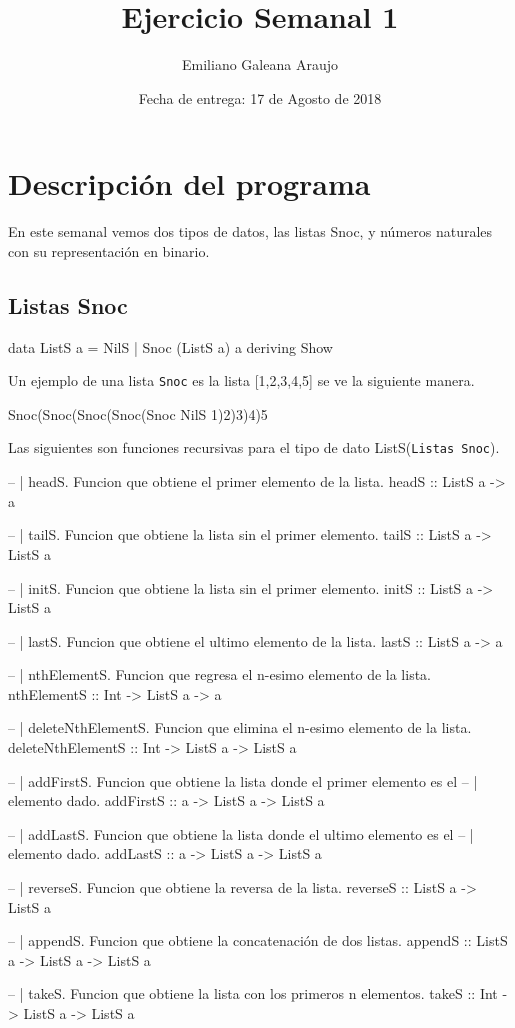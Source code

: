 \documentclass[spanish,12pt,letterpaper]{article}
\title{Ejercicio Semanal 1}
\author{Emiliano Galeana Araujo}
\affil{Facultad de Ciencias, UNAM}
\date{Fecha de entrega: 17 de Agosto de 2018}
\begin{document}
\maketitle

\section{Descripción del programa}
En este semanal vemos dos tipos de datos, las listas Snoc, y números naturales
con su representación en binario.
\subsection{Listas Snoc}

\begin{code}
  data ListS a = NilS | Snoc (ListS a) a deriving Show
\end{code}
Un ejemplo de una lista \texttt{Snoc} es la lista [1,2,3,4,5] se ve la siguiente manera.
\begin{code}
  Snoc(Snoc(Snoc(Snoc(Snoc NilS 1)2)3)4)5
\end{code}

Las siguientes son funciones recursivas para el tipo de dato ListS(\texttt{Listas Snoc}).

\begin{code}
  -- | headS. Funcion que obtiene el primer elemento de la lista.
  headS :: ListS a -> a

  -- | tailS. Funcion que obtiene la lista sin el primer elemento.
  tailS :: ListS a -> ListS a

  -- | initS. Funcion que obtiene la lista sin el primer elemento.
  initS :: ListS a -> ListS a

  -- | lastS. Funcion que obtiene el ultimo elemento de la lista.
  lastS :: ListS a -> a

  -- | nthElementS. Funcion que regresa el n-esimo elemento de la lista.
  nthElementS :: Int -> ListS a -> a

  -- | deleteNthElementS. Funcion que elimina el n-esimo elemento de la lista.
  deleteNthElementS :: Int -> ListS a -> ListS a

  -- | addFirstS. Funcion que obtiene la lista donde el primer elemento es el
  -- | elemento dado.
  addFirstS :: a -> ListS a -> ListS a

  -- | addLastS. Funcion que obtiene la lista donde el ultimo elemento es el
  -- | elemento dado.
  addLastS :: a -> ListS a -> ListS a

  -- | reverseS. Funcion que obtiene la reversa de la lista.
  reverseS :: ListS a -> ListS a

  -- | appendS. Funcion que obtiene la concatenación de dos listas.
  appendS :: ListS a -> ListS a -> ListS a

  -- | takeS. Funcion que obtiene la lista con los primeros n elementos.
  takeS :: Int -> ListS a -> ListS a
\end{code}
\end{document}
